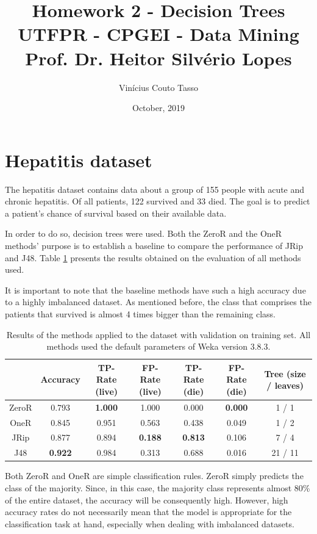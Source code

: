 \documentclass{article}
\title{Homework 2 - Decision Trees \\
        \vspace{5px} \large UTFPR - CPGEI - Data Mining \\
        Prof. Dr. Heitor Silvério Lopes}
\author{Vinícius Couto Tasso}
\date{October, 2019}
\begin{document}
\maketitle

\section*{Hepatitis dataset}


\indent The hepatitis dataset contains data about a group of 155 people with acute and chronic hepatitis. Of all patients, 122 survived and 33 died. The goal is to predict a patient's chance of survival based on their available data.

In order to do so, decision trees were used. Both the ZeroR and the OneR methods' purpose is to establish a baseline to compare the performance of JRip and J48. Table \ref{tab:training_set} presents the results obtained on the evaluation of all methods used.

It is important to note that the baseline methods have such a high accuracy due to a highly imbalanced dataset. As mentioned before, the class that comprises the patients that survived is almost 4 times bigger than the remaining class.

\begin{table}[htp]
    \begin{tabular}{c|c|c|c|c|c|c}
         & Accuracy & TP-Rate (live) & FP-Rate (live) & TP-Rate (die) & FP-Rate (die) & Tree (size / leaves) \\ \hline
         ZeroR & 0.793 & \textbf{1.000} & 1.000 & 0.000 & \textbf{0.000} & 1 / 1 \\
         OneR & 0.845 & 0.951 & 0.563 &  0.438 & 0.049 & 1 / 2 \\
         JRip & 0.877 & 0.894 & \textbf{0.188} & \textbf{0.813} & 0.106 & 7 / 4  \\
         J48 & \textbf{0.922} & 0.984 & 0.313 & 0.688 & 0.016 & 21 / 11 \\
    \end{tabular}
    \caption{Results of the methods applied to the dataset with validation on training set. All methods used the default parameters of Weka version 3.8.3.}
    \label{tab:training_set}
\end{table}

Both ZeroR and OneR are simple classification rules. ZeroR simply predicts the class of the majority. Since, in this case, the majority class represents almost 80\% of the entire dataset, the accuracy will be consequently high. However, high accuracy rates do not necessarily mean that the model is appropriate for the classification task at hand, especially when dealing with imbalanced datasets.
\end{document}
